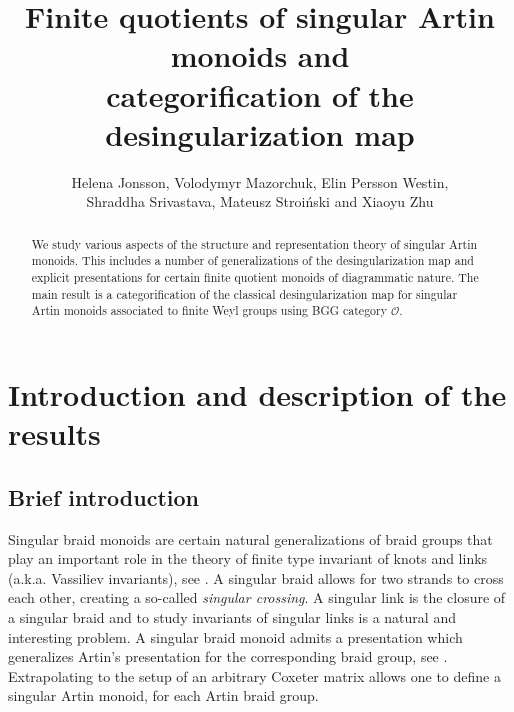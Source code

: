 \documentclass[a4paper]{amsart}
\begin{document}
\title[Categorification of the desingularization map]
{Finite quotients of singular Artin monoids and \\ categorification of the desingularization map}

\author[Jonsson, Mazorchuk, Persson Westin, Srivastava, Stroi{\'n}ski, Zhu]
{Helena Jonsson, Volodymyr Mazorchuk, Elin Persson Westin,\\
Shraddha Srivastava, Mateusz Stroi{\'n}ski and  Xiaoyu Zhu}

\begin{abstract}
We study various aspects of the structure and representation
theory of singular Artin monoids. This includes a number of 
generalizations  of the desingularization map and explicit 
presentations for certain finite quotient monoids of diagrammatic
nature. The main result is a categorification of the classical
desingularization map for singular Artin monoids associated to 
finite Weyl groups using BGG category $\mathcal{O}$.
\end{abstract}

\maketitle

\section{Introduction and description of the results}\label{s1}

\subsection{Brief introduction}\label{s1.1}

Singular braid monoids are certain natural generalizations of braid groups
that play an important role in the theory of finite type invariant of
knots and links (a.k.a. Vassiliev invariants), see \cite{Bi93}.
A singular braid allows for two strands to cross each other, creating
a so-called {\em singular crossing}. A singular link is the closure of 
a singular braid and to study invariants of singular links is a
natural and interesting problem. A singular braid monoid admits 
a presentation which generalizes Artin's presentation for the 
corresponding braid group, see \cite[Lemma~3]{Bi93}. Extrapolating
to the setup of an arbitrary Coxeter matrix allows one to define
a singular Artin monoid, for each Artin braid group.
\end{document}
